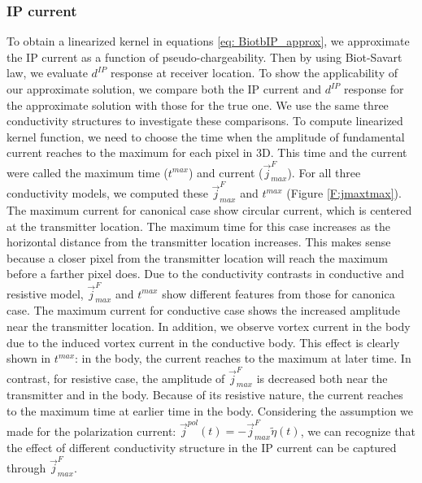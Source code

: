 \documentclass[a4paper, 11pt]{article}
\renewcommand {\j}  { {\vec j} }
\newcommand{\peta}{\tilde{\eta}}
\newcommand{\dip}{d^{IP}}
\begin{document}
\subsubsection{IP current}
To obtain a linearized kernel in equations \ref{eq: BiotbIP_approx}, we approximate the IP current as a function of pseudo-chargeability. Then by using Biot-Savart law, we evaluate $\dip$ response at receiver location. To show the applicability of our approximate solution, we compare both the IP current and $\dip$ response for the approximate solution with those for the true one. We use the same three conductivity structures to investigate these comparisons. To compute linearized kernel function, we need to choose the time when the amplitude of fundamental current reaches to the maximum for each pixel in 3D. This time and the current were called the maximum time ($t^{max}$) and current ($\j^{F}_{max}$). For all three conductivity models, we computed these $\j^{F}_{max}$ and $t^{max}$ (Figure \ref{F:jmaxtmax}). The maximum current for canonical case show circular current, which is centered at the transmitter location. The maximum time for this case increases as the horizontal distance from the transmitter location increases. This makes sense because a closer pixel from the transmitter location will reach the maximum before a farther pixel does. Due to the conductivity contrasts in conductive and resistive model, $\j^{F}_{max}$ and $t^{max}$ show different features from those for canonica case. The maximum current for conductive case shows the increased amplitude near the transmitter location. In addition, we observe vortex current in the body due to the induced vortex current in the conductive body. This effect is clearly shown in $t^{max}$: in the body, the current reaches to the maximum at later time. In contrast, for resistive case, the amplitude of $\j^{F}_{max}$ is decreased both near the transmitter and in the body. Because of its resistive nature, the current reaches to the maximum time at earlier time in the body. Considering the assumption we made for the polarization current: $\j^{pol}(t) = -\j^F_{max}\peta(t)$, we can recognize that the effect of different conductivity structure in the IP current can be captured through $\j^{F}_{max}$. 
\end{document}
